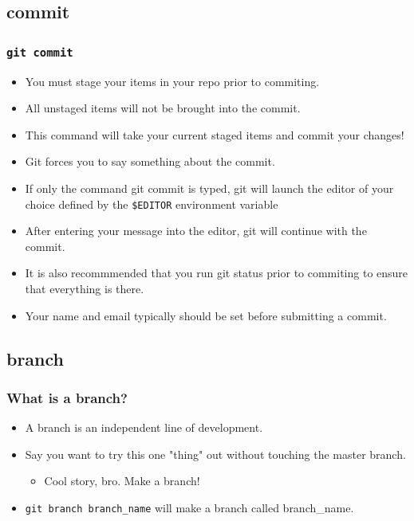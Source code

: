 \documentclass{beamer}
\begin{document}
\subsection{commit}
\begin{frame}
    \frametitle{\texttt{git commit}}
    \begin{itemize}
        \item{You must stage your items in your repo prior to commiting.}
        \item{All unstaged items will not be brought into the commit.}
        \item{This command will take your current staged items and commit your changes!}
        \item{Git forces you to say something about the commit.}
        \item{If only the command git commit is typed, git will launch the editor of your choice defined by the \texttt{\$EDITOR} environment variable}
        \item{After entering your message into the editor, git will continue with the commit.}
        \item{It is also recommmended that you run git status prior to commiting to ensure that everything is there.}
        \item{Your name and email typically should be set before submitting a commit.}
    \end{itemize}
\end{frame}

\subsection{branch}
\begin{frame}
    \frametitle{What is a branch?}
    \begin{itemize}
        \item{A branch is an independent line of development.}
        \item{Say you want to try this one "thing" out without touching the master branch.}
            \begin{itemize}
                \item{Cool story, bro. Make a branch!}
            \end{itemize}
        \item{\texttt{git branch branch\_name} will make a branch called branch\_name.}
    \end{itemize}
\end{frame}
\end{document}
